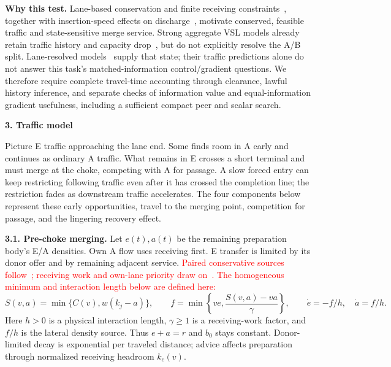 \documentclass[10pt,a4paper]{article}
\newcommand{\head}[1]{\par\vspace{4pt}\noindent\textbf{#1}\par\nobreak\vspace{1pt}}
\newcommand{\rev}[1]{\textcolor{red}{#1}}
\begin{document}
\begingroup\color{red}
\textbf{Why this test.} Lane-based conservation and finite receiving
constraints~\cite{subraveti,carey}, together with insertion-speed effects
on discharge~\cite{leclercq2011,leclercq}, motivate conserved, feasible
traffic and state-sensitive merge service. Strong aggregate VSL models
already retain traffic history and capacity drop~\cite{wei}, but do not
explicitly resolve the A/B split. Lane-resolved models~\cite{subraveti,carey}
supply that state; their traffic predictions alone do not answer this task's
matched-information control/gradient questions. We therefore require
complete travel-time accounting through clearance, lawful history inference,
and separate checks of information value and equal-information gradient
usefulness, including a sufficient compact peer and scalar search.
\endgroup

\newpage
\head{3. Traffic model}
\begingroup\color{red}
Picture E traffic approaching the lane end. Some finds room in A early and
continues as ordinary A traffic. What remains in E crosses a short terminal
and must merge at the choke, competing with A for passage. A slow forced
entry can keep restricting following traffic even after it has crossed the
completion line; the restriction fades as downstream traffic accelerates.
The four components below represent these early opportunities, travel to
the merging point, competition for passage, and the lingering recovery effect.
\endgroup

\textbf{3.1. Pre-choke merging.}
Let $e(t),a(t)$ be the remaining preparation body's E/A densities.
Own A flow uses receiving first. E transfer is limited by its donor offer
and by remaining adjacent service.
\rev{Paired conservative sources follow~\cite{subraveti}; receiving work
and own-lane priority draw on~\cite{carey}. The homogeneous minimum and
interaction length below are defined here:}
\begin{equation}
 S(v,a)=\min\{C(v),w(k_j-a)\},\qquad
 f=\min\!\left\{ve,\frac{S(v,a)-va}{\gamma}\right\},\qquad
 \dot e=-f/h,\quad \dot a=f/h.
 \label{eq:prep}
\end{equation}
Here $h>0$ is a physical interaction length, $\gamma\geq1$ is a receiving-work
factor, and $f/h$ is the lateral density source. Thus $e+a=r$ and $b_0$
stays constant. Donor-limited decay is exponential per traveled distance;
advice affects preparation through normalized receiving headroom $k_c(v)$.
\end{document}
